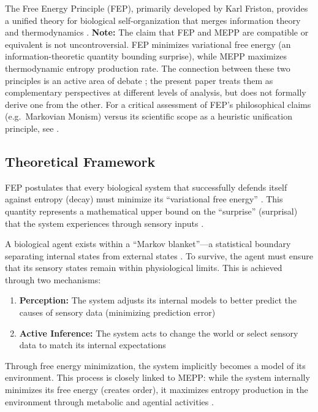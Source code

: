 \documentclass[12pt,a4paper]{article}
\theoremstyle{remark}
\begin{document}
The Free Energy Principle (FEP), primarily developed by Karl Friston, provides a unified theory for biological self-organization that merges information theory and thermodynamics \citep{FristonFreeEnergy,FristonPDF}. \textbf{Note:} The claim that FEP and MEPP are compatible or equivalent is not uncontroversial. FEP minimizes variational free energy (an information-theoretic quantity bounding surprise), while MEPP maximizes thermodynamic entropy production rate. The connection between these two principles is an active area of debate \citep{FristonFreeEnergy}; the present paper treats them as complementary perspectives at different levels of analysis, but does not formally derive one from the other. For a critical assessment of FEP's philosophical claims (e.g.\ Markovian Monism) versus its scientific scope as a heuristic unification principle, see \cite{SanchezCanizares2021}.

\subsection{Theoretical Framework}

FEP postulates that every biological system that successfully defends itself against entropy (decay) must minimize its ``variational free energy'' \citep{FristonFreeEnergy}. This quantity represents a mathematical upper bound on the ``surprise'' (surprisal) that the system experiences through sensory inputs \citep{FristonFreeEnergy}.

A biological agent exists within a ``Markov blanket''---a statistical boundary separating internal states from external states \citep{FristonPDF}. To survive, the agent must ensure that its sensory states remain within physiological limits. This is achieved through two mechanisms:

\begin{enumerate}
    \item \textbf{Perception:} The system adjusts its internal models to better predict the causes of sensory data (minimizing prediction error) \citep{FristonFreeEnergy}
    \item \textbf{Active Inference:} The system acts to change the world or select sensory data to match its internal expectations \citep{FristonFreeEnergy}
\end{enumerate}

Through free energy minimization, the system implicitly becomes a model of its environment. This process is closely linked to MEPP: while the system internally minimizes its free energy (creates order), it maximizes entropy production in the environment through metabolic and agential activities \citep{FristonPDF}.
\end{document}
